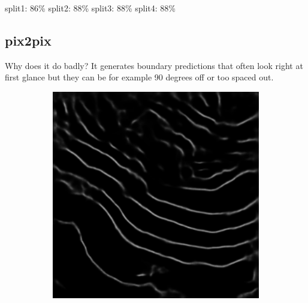 split1: 86\%
split2: 88\%
split3: 88\%
split4: 88\%

\subsection{pix2pix}

Why does it do badly? It generates boundary predictions that often look right at first glance but they can be for example 90 degrees off or too spaced out.

\begin{figure}[!t]
    \centering
    \begin{subfigure}[t]{0.24\textwidth}
        \centering
        \includegraphics[width=1\textwidth, valign=c]{images/abl-none.png}
        \caption{}
    \end{subfigure}
    \begin{subfigure}[t]{0.24\textwidth}
        \centering

\end{subfigure}
\end{figure}
